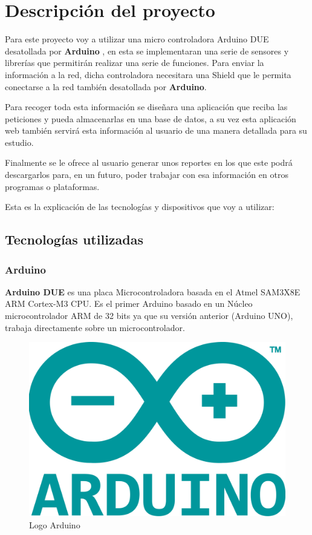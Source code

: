 \chapter{Descripción del proyecto}

\setlength{\parindent}{5ex}Para este proyecto voy a utilizar una micro controladora Arduino DUE desatollada por \textbf{Arduino} , en esta se implementaran una serie de sensores y librerías que permitirán realizar una serie de funciones. Para enviar la información a la red, dicha controladora necesitara una Shield que le permita conectarse a la red también desatollada por \textbf{Arduino}.

\setlength{\parindent}{0ex}Para recoger toda esta información se diseñara una aplicación que reciba las peticiones y pueda almacenarlas en una base de datos, a su vez esta aplicación web también servirá esta información al usuario de una manera detallada para su estudio.

Finalmente se le ofrece al usuario generar unos reportes en los que este podrá descargarlos para, en un futuro, poder trabajar con esa información en otros programas o plataformas.

Esta es la explicación de las tecnologías y dispositivos que voy a utilizar:

\section{Tecnologías utilizadas}

\subsection{Arduino}

\setlength{\parindent}{5ex}\textbf{Arduino DUE }es una placa Microcontroladora basada en el Atmel SAM3X8E ARM Cortex-M3 CPU. Es el primer Arduino basado en un Núcleo microcontrolador ARM de 32 bits ya que su versión anterior (Arduino UNO), trabaja directamente sobre un microcontrolador.

\begin{figure}[!h]
	\centering
	\includegraphics[width=0.2\linewidth]{figuras/ardulogo}
	\caption{Logo Arduino}
	\label{fig:ardulogo}
\end{figure}

